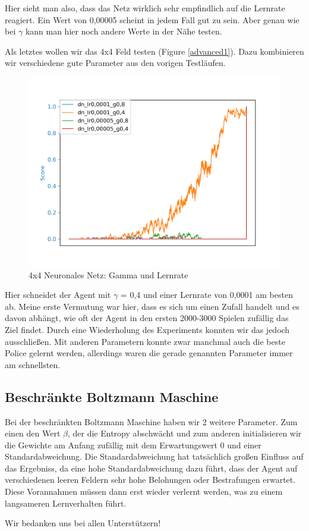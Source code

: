 Hier sieht man also, dass das Netz wirklich sehr empfindlich auf die Lernrate reagiert. Ein Wert von 0,00005 scheint in jedem Fall gut zu sein. Aber genau wie bei $\gamma$ kann man hier noch andere Werte in der Nähe testen.

Als letztes wollen wir das 4x4 Feld testen (Figure \ref{advanced1}). Dazu kombinieren wir verschiedene gute Parameter aus den vorigen Testläufen.

\begin{figure}[H]
\centering
\includegraphics[width=\textwidth]{Figures/4x4_16_dn_lr0,0001_g0,8_dn_lr0,0001_g0,4_dn_lr0,00005_g0,8_dn_lr0,00005_g0,4.png}
\caption{4x4 Neuronales Netz: Gamma und Lernrate}
\label{dn5}
\end{figure}

Hier schneidet der Agent mit $\gamma$ = 0,4 und einer Lernrate von 0,0001 am besten ab. Meine erste Vermutung war hier, dass es sich um einen Zufall handelt und es davon abhängt, wie oft der Agent in den ersten 2000-3000 Spielen zufällig das Ziel findet. Durch eine Wiederholung des Experiments konnten wir das jedoch ausschließen. Mit anderen Parametern konnte zwar manchmal auch die beste Police gelernt werden, allerdings waren die gerade genannten Parameter immer am schnellsten.

\subsection{Beschränkte Boltzmann Maschine}
\label{subsec:dbm_r}

Bei der beschränkten Boltzmann Maschine haben wir 2 weitere Parameter. Zum einen den Wert $\beta$, der die Entropy abschwächt und zum anderen initialisieren wir die Gewichte am Anfang zufällig mit dem Erwartungswert 0 und einer Standardabweichung. Die Standardabweichung hat tatsächlich großen Einfluss auf das Ergebniss, da eine hohe Standardabweichung dazu führt, dass der Agent auf verschiedenen leeren Feldern sehr hohe Belohungen oder Bestrafungen erwartet. Diese Vorannahmen müssen dann erst wieder verlernt werden, was zu einem langsameren Lernverhalten führt.

\newpage



\begin{acknowledgement}
Wir bedanken uns bei allen Unterstützern!
\end{acknowledgement}